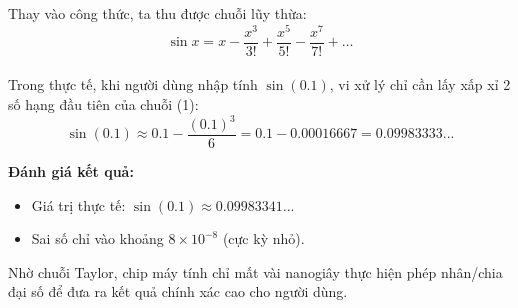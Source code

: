 \documentclass[12pt]{article}
\theoremstyle{definition}
\theoremstyle{remark}
\begin{document}
Thay vào công thức, ta thu được chuỗi lũy thừa:
\begin{equation}
    \sin x = x - \frac{x^3}{3!} + \frac{x^5}{5!} - \frac{x^7}{7!} + \dots
\end{equation}\\
Trong thực tế, khi người dùng nhập tính $\sin(0.1)$, vi xử lý chỉ cần lấy xấp xỉ 2 số hạng đầu tiên của chuỗi (1):
\begin{equation}
    \sin(0.1) \approx 0.1 - \frac{(0.1)^3}{6} = 0.1 - 0.00016667 = 0.09983333...
\end{equation}

\begin{note}
\textbf{Đánh giá kết quả:}
\begin{itemize}
    \item Giá trị thực tế: $\sin(0.1) \approx 0.09983341...$
    \item Sai số chỉ vào khoảng $8 \times 10^{-8}$ (cực kỳ nhỏ).
\end{itemize}
Nhờ chuỗi Taylor, chip máy tính chỉ mất vài nanogiây thực hiện phép nhân/chia đại số để đưa ra kết quả chính xác cao cho người dùng.
\end{note}
\end{document}
